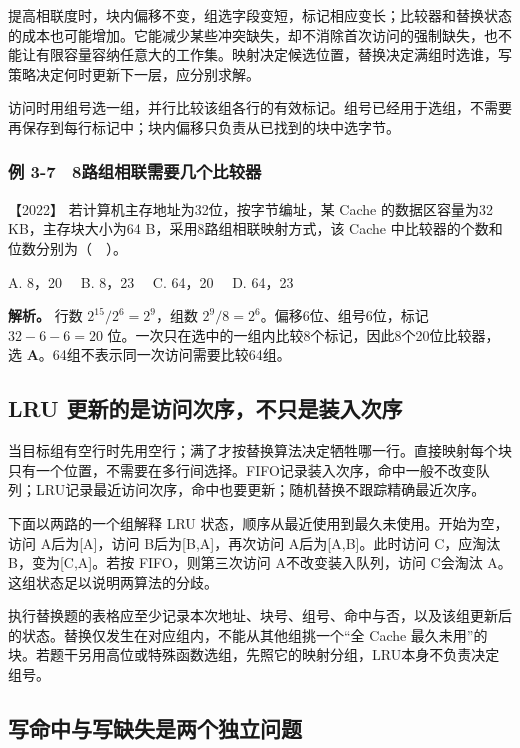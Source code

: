提高相联度时，块内偏移不变，组选字段变短，标记相应变长；比较器和替换状态的成本也可能增加。它能减少某些冲突缺失，却不消除首次访问的强制缺失，也不能让有限容量容纳任意大的工作集。映射决定候选位置，替换决定满组时选谁，写策略决定何时更新下一层，应分别求解。

访问时用组号选一组，并行比较该组各行的有效标记。组号已经用于选组，不需要再保存到每行标记中；块内偏移只负责从已找到的块中选字节。

\subsubsection{例 3-7　8路组相联需要几个比较器}\label{co-ex3-7}

\noindent{}【2022】 若计算机主存地址为32位，按字节编址，某 Cache 的数据区容量为32 KB，主存块大小为64 B，采用8路组相联映射方式，该 Cache 中比较器的个数和位数分别为（　）。

A. 8，20　 B. 8，23　 C. 64，20　 D. 64，23


\textbf{解析。} 行数 \(2^{15}/2^6=2^9\)，组数 \(2^9/8=2^6\)。偏移6位、组号6位，标记 \(32-6-6=20\) 位。一次只在选中的一组内比较8个标记，因此8个20位比较器，选 \textbf{A}。64组不表示同一次访问需要比较64组。

\subsection{LRU 更新的是访问次序，不只是装入次序}\label{co-03-09}

当目标组有空行时先用空行；满了才按替换算法决定牺牲哪一行。直接映射每个块只有一个位置，不需要在多行间选择。FIFO记录装入次序，命中一般不改变队列；LRU记录最近访问次序，命中也要更新；随机替换不跟踪精确最近次序。

下面以两路的一个组解释 LRU 状态，顺序从最近使用到最久未使用。开始为空，访问 A后为{[}A{]}，访问 B后为{[}B,A{]}，再次访问 A后为{[}A,B{]}。此时访问 C，应淘汰 B，变为{[}C,A{]}。若按 FIFO，则第三次访问 A不改变装入队列，访问 C会淘汰 A。这组状态足以说明两算法的分歧。

执行替换题的表格应至少记录本次地址、块号、组号、命中与否，以及该组更新后的状态。替换仅发生在对应组内，不能从其他组挑一个``全 Cache 最久未用''的块。若题干另用高位或特殊函数选组，先照它的映射分组，LRU本身不负责决定组号。

\subsection{写命中与写缺失是两个独立问题}\label{co-03-10}

